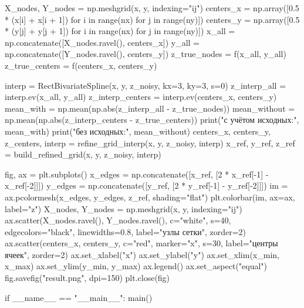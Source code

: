 \documentclass[a4paper, 14pt]{extarticle}
\begin{document}
\begin{breakablelisting}
    X_nodes, Y_nodes = np.meshgrid(x, y, indexing="ij")
    centers_x = np.array([0.5 * (x[i] + x[i + 1]) for i in range(nx) for j in range(ny)])
    centers_y = np.array([0.5 * (y[j] + y[j + 1]) for i in range(nx) for j in range(ny)])
    x_all = np.concatenate([X_nodes.ravel(), centers_x])
    y_all = np.concatenate([Y_nodes.ravel(), centers_y])
    z_true_nodes = f(x_all, y_all)
    z_true_centers = f(centers_x, centers_y)

    interp = RectBivariateSpline(x, y, z_noisy, kx=3, ky=3, s=0)
    z_interp_all = interp.ev(x_all, y_all)
    z_interp_centers = interp.ev(centers_x, centers_y)
    mean_with = np.mean(np.abs(z_interp_all - z_true_nodes))
    mean_without = np.mean(np.abs(z_interp_centers - z_true_centers))
    print("с учётом исходных:", mean_with)
    print("без исходных:", mean_without)
    centers_x, centers_y, z_centers, interp = refine_grid_interp(x, y, z_noisy, interp)
    x_ref, y_ref, z_ref = build_refined_grid(x, y, z_noisy, interp)

    fig, ax = plt.subplots()
    x_edges = np.concatenate([x_ref, [2 * x_ref[-1] - x_ref[-2]]])
    y_edges = np.concatenate([y_ref, [2 * y_ref[-1] - y_ref[-2]]])
    im = ax.pcolormesh(x_edges, y_edges, z_ref, shading="flat")
    plt.colorbar(im, ax=ax, label="z")
    X_nodes, Y_nodes = np.meshgrid(x, y, indexing="ij")
    ax.scatter(X_nodes.ravel(), Y_nodes.ravel(), c="white", s=40, edgecolors="black", linewidths=0.8, label="узлы сетки", zorder=2)
    ax.scatter(centers_x, centers_y, c="red", marker="x", s=30, label="центры ячеек", zorder=2)
    ax.set_xlabel("x")
    ax.set_ylabel("y")
    ax.set_xlim(x_min, x_max)
    ax.set_ylim(y_min, y_max)
    ax.legend()
    ax.set_aspect("equal")
    fig.savefig("result.png", dpi=150)
    plt.close(fig)


if __name__ == "__main__":
    main()
\end{breakablelisting}
\end{document}
